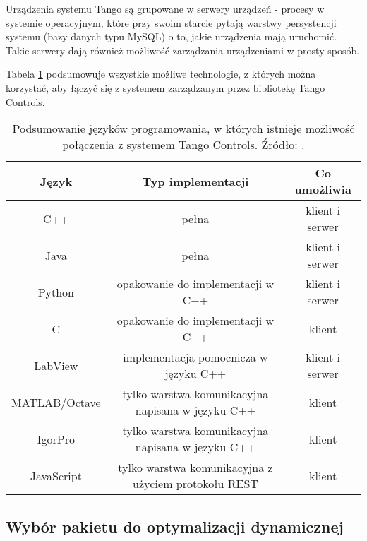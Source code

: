 Urządzenia systemu Tango są grupowane w serwery urządzeń - procesy w systemie operacyjnym, które przy swoim starcie pytają warstwy persystencji systemu (bazy danych typu MySQL) o to, jakie urządzenia mają uruchomić. Takie serwery dają również możliwość zarządzania urządzeniami w prosty sposób.


Tabela \ref{tab:tango-implementations} podsumowuje wszystkie możliwe technologie, z których można korzystać, aby łączyć się z systemem zarządzanym przez bibliotekę Tango Controls.

\begin{table}[hpt]
    \centering
    \begin{tabular}{|c|c|c|}
        \hline 
        \textbf{Język} & \textbf{Typ implementacji} &\textbf{Co umożliwia} \\ 
        \hline 
        C++ & pełna & klient i serwer \\ 
        \hline 
        Java & pełna & klient i serwer \\ 
        \hline 
        Python & opakowanie do implementacji w C++ & klient i serwer \\ 
        \hline 
        C & opakowanie do implementacji w C++ & klient \\ 
        \hline 
        LabView & implementacja pomocnicza w języku C++ & klient i serwer \\ 
        \hline 
        MATLAB/Octave & tylko warstwa komunikacyjna napisana w języku C++ & klient \\ 
        \hline 
        IgorPro & tylko warstwa komunikacyjna napisana w języku C++ & klient \\ 
        \hline 
        JavaScript & tylko warstwa komunikacyjna z użyciem protokołu REST & klient \\ 
        \hline 
    \end{tabular}
    \caption{Podsumowanie języków programowania, w których istnieje możliwość połączenia z systemem Tango Controls. Źródło: \cite{TangoWebsite}.}
    \label{tab:tango-implementations}
\end{table}

\subsection{Wybór pakietu do optymalizacji dynamicznej}
\label{sub:czesc-wyzsza-wybor}

